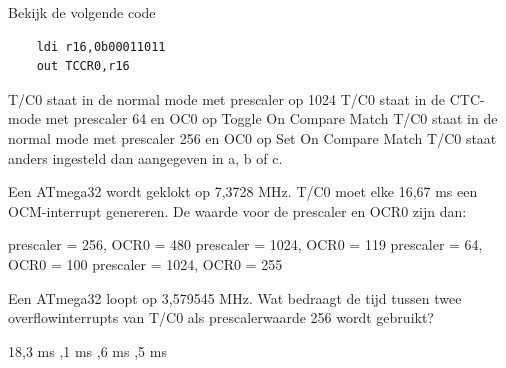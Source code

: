 \documentclass[a4paper,12pt,fleqn,dutch,mimicwordtwentyten]{tisdexam}
\begin{document}
\begin{questions}
\newpage
\question
\label{opg:opg14}
Bekijk de volgende code
\begin{lstlisting}
    ldi r16,0b00011011
    out TCCR0,r16
\end{lstlisting}
\begin{choices}
	\choice T/C0 staat in de normal mode met prescaler op 1024
	\CorrectChoice \label{ans:opg14} T/C0 staat in de CTC-mode met prescaler 64 en OC0 op Toggle On Compare Match
	\choice T/C0 staat in de normal mode met prescaler 256 en OC0 op Set On Compare Match
	\choice T/C0 staat anders ingesteld dan aangegeven in a, b of c.
\end{choices}


\question
\label{opg:opg15}
Een ATmega32 wordt geklokt op 7,3728 MHz. T/C0 moet elke 16,67 ms een OCM-interrupt
genereren. De waarde voor de prescaler en OCR0 zijn dan:
\begin{choices}
	\choice prescaler = 256, OCR0 = 480
	\CorrectChoice \label{ans:opg15} prescaler = 1024, OCR0 = 119
	\choice prescaler = 64, OCR0 = 100
	\choice prescaler = 1024, OCR0 = 255
\end{choices}


\question
\label{opg:opg16}
Een ATmega32 loopt op 3,579545 MHz. Wat bedraagt de tijd tussen twee overflowinterrupts
van T/C0 als prescalerwaarde 256 wordt gebruikt?
\begin{choices}
	\CorrectChoice \label{ans:opg16} 18,3 ms
	,1 ms
	,6 ms
	,5 ms
\end{choices}



\end{questions}
\end{document}
